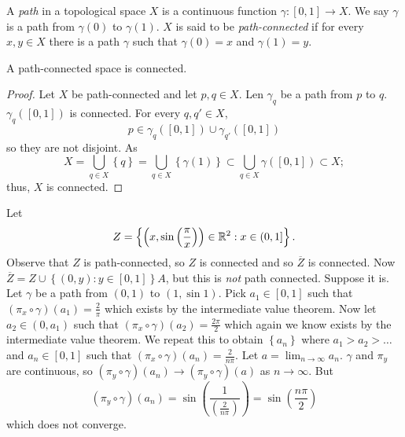 
\begin{definition}
	A \emph{path} in a topological space $X$ is a continuous function
	$\gamma: [0,1] \to X$.
	We say $\gamma$ is a path from $\gamma(0)$ to $\gamma(1)$.
	$X$ is said to be \emph{path-connected} if for every $x, y \in X$
	there is a path $\gamma$ such that $\gamma(0) = x$ and $\gamma(1) = y$.
\end{definition}

\begin{proposition}[]
	A path-connected space is connected.
\end{proposition}

\begin{proof}
	Let $X$ be path-connected and let $p,q \in X$.
	Len $\gamma_q$ be a path from $p$ to $q$.
	$\gamma_q([0,1])$ is connected.
	For every $q,q' \in X$,
	\[
		p \in \gamma_q([0,1]) \cup \gamma_{q'}([0,1])
	\]
	so they are not disjoint.
	As
	\[
		X
		= \bigcup_{q \in X} \left\{
			q
		\right\}
		= \bigcup_{q \in X} \left\{
			\gamma(1)
		\right\}
		\subset \bigcup_{q \in X} \gamma([0,1])
		\subset X;
	\]
	thus, $X$ is connected.
\end{proof}

\begin{example}[]
	Let \[
		Z = \left\{
			\left( 
				x, \sin\left( 
					\frac{\pi}x 
				\right) 
			\right) \in \mathbb{R}^2 : x \in (0,1]
		\right\}.
	\]
	Observe that $Z$ is path-connected, so $Z$ is connected and so
	$\overline Z$ is connected.
	Now $\overline Z = Z \cup \left\{
		(0,y): y \in [0,1]
	\right\}A$, but this is \emph{not} path connected.
	Suppose it is.
	Let $\gamma$ be a path from $(0,1)$ to $(1, \sin 1)$.
	Pick $a_1 \in [0,1]$ such that $(\pi_x \circ \gamma)(a_1) = \frac2\pi$
	which exists by the intermediate value theorem.
	Now let $a_2 \in (0, a_1)$ such that
	$(\pi_x \circ \gamma)(a_2) = \frac{2\pi}2$ which again we know exists
	by the intermediate value theorem.
	We repeat this to obtain $\left\{
		a_n
	\right\}$ where $a_1 > a_2 > \ldots$ and $a_n \in [0,1]$
	such that $(\pi_x \circ \gamma)(a_n) = \frac2{n\pi}$.
	Let $a = \lim_{n \to \infty} a_n$.
	$\gamma$ and $\pi_y$ are continuous, so
	$(\pi_y \circ \gamma)(a_n) \to (\pi_y \circ \gamma)(a)$
	as $n \to \infty$.
	But \[
		(\pi_y \circ \gamma)(a_n)
		= \sin\left( 
			\frac{1}{\left( 
				\frac{2}{n\pi} 
			\right)}
		\right)
		= \sin\left( 
			\frac{n\pi}{2} 
		\right)
	\]
	which does not converge.
\end{example}

